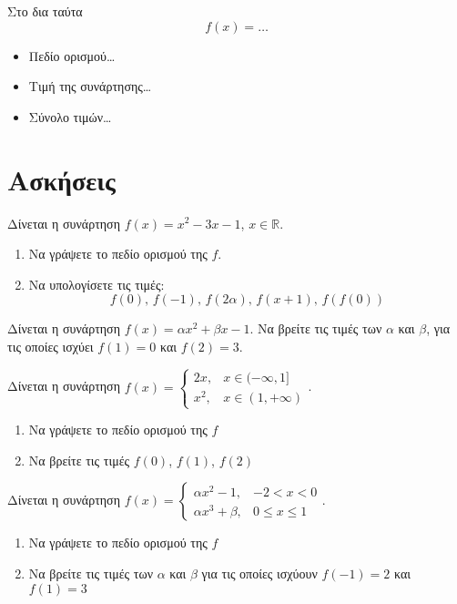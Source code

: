 \documentclass{../../presentation}
\begin{document}
\begin{frame}{Στο δια ταύτα}
  $$f(x)=\dots$$
  \begin{itemize}
    \item Πεδίο ορισμού\dots
    \item Τιμή της συνάρτησης\dots
    \item Σύνολο τιμών\dots
  \end{itemize}
\end{frame}

\moodle

\section{Ασκήσεις}

\exercises

\begin{askisi}
  Δίνεται η συνάρτηση $f(x)=x^2-3x-1$, $x\in\mathbb{R}$.
  \begin{enumerate}[<+->]
    \item Να γράψετε το πεδίο ορισμού της $f$.
    \item Να υπολογίσετε τις τιμές:
          $$f(0) \text{, } f(-1) \text{, }f(2α) \text{, }f(x+1) \text{, }f\left(f(0)\right) $$
  \end{enumerate}
\end{askisi}

\begin{askisi}
  Δίνεται η συνάρτηση $f(x)=αx^2+βx-1$. Να βρείτε τις τιμές των $α$ και $β$, για τις οποίες ισχύει $f(1)=0$ και $f(2)=3$.
\end{askisi}

\begin{askisi}
  Δίνεται η συνάρτηση $f(x)=
    \begin{cases}
      2x,  & x\in(-\infty,1] \\
      x^2, & x\in(1,+\infty)
    \end{cases}$.
  \begin{enumerate}[<+->]
    \item Να γράψετε το πεδίο ορισμού της $f$
    \item Να βρείτε τις τιμές $f(0)$, $f(1)$, $f(2)$
  \end{enumerate}
\end{askisi}

\begin{askisi}
  Δίνεται η συνάρτηση $f(x)=
    \begin{cases}
      αx^2-1, & -2<x<0      \\
      αx^3+β, & 0\le x\le 1
    \end{cases}$.
  \begin{enumerate}[<+->]
    \item Να γράψετε το πεδίο ορισμού της $f$
    \item Να βρείτε τις τιμές των $α$ και $β$ για τις οποίες ισχύουν $f(-1)=2$ και $f(1)=3$
  \end{enumerate}
\end{askisi}
\end{document}
